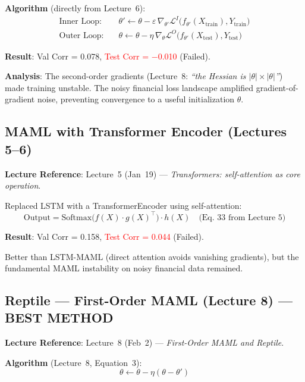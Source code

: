 \documentclass[11pt,a4paper]{article}
\begin{document}
\textbf{Algorithm} (directly from Lecture~6):
\begin{align}
    \text{Inner Loop:} \quad &\theta' \leftarrow \theta - \varepsilon \, \nabla_{\theta'} \mathcal{L}^I\bigl(f_{\theta'}(X_{\text{train}}), Y_{\text{train}}\bigr) \label{eq:inner}\\
    \text{Outer Loop:} \quad &\theta \leftarrow \theta - \eta \, \nabla_\theta \mathcal{L}^O\bigl(f_{\theta'}(X_{\text{test}}), Y_{\text{test}}\bigr) \label{eq:outer}
\end{align}

\textbf{Result}: Val Corr = 0.078, \textcolor{red}{Test Corr = $-$0.010} (Failed).

\textbf{Analysis}: The second-order gradients (Lecture~8: \emph{``the Hessian is $|\theta| \times |\theta|$''}) made training unstable. The noisy financial loss landscape amplified gradient-of-gradient noise, preventing convergence to a useful initialization $\theta$.

\subsection{MAML with Transformer Encoder \textnormal{(Lectures 5--6)}}

\textbf{Lecture Reference}: Lecture~5 (Jan~19) --- \emph{Transformers: self-attention as core operation}.

Replaced LSTM with a TransformerEncoder using self-attention:
\begin{equation}
    \text{Output} = \text{Softmax}\bigl(f(X) \cdot g(X)^\top\bigr) \cdot h(X) \quad \text{(Eq.~33 from Lecture~5)}
\end{equation}

\textbf{Result}: Val Corr = 0.158, \textcolor{red}{Test Corr = 0.044} (Failed).

Better than LSTM-MAML (direct attention avoids vanishing gradients), but the fundamental MAML instability on noisy financial data remained.

\subsection{Reptile --- First-Order MAML \textnormal{(Lecture 8)} \textcolor{green!60!black}{--- BEST METHOD}}

\textbf{Lecture Reference}: Lecture~8 (Feb~2) --- \emph{First-Order MAML and Reptile}.

\textbf{Algorithm} (Lecture~8, Equation~3):
\begin{equation}
    \boxed{\theta \leftarrow \theta - \eta(\theta - \theta')}
\end{equation}
\end{document}
